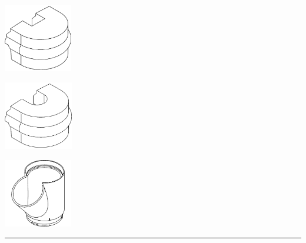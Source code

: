 \begin{center}
    \begin{minipage}{0.3\textwidth}
        \centering
        \includegraphics[height=3cm]{images/wireframes/cable_gland_2wire.png}
    \end{minipage}
    \hfill
    \begin{minipage}{0.3\textwidth}
        \centering
        \includegraphics[height=3cm]{images/wireframes/cable_gland_3wire.png}
    \end{minipage}
    \hfill
    \begin{minipage}{0.3\textwidth}
        \centering
        \includegraphics[height=3cm]{images/wireframes/80mm_base_module.png}
    \end{minipage}

    \vspace{8pt}
    \rule{\textwidth}{0.5pt}
    \vspace{2pt}


\end{center}
